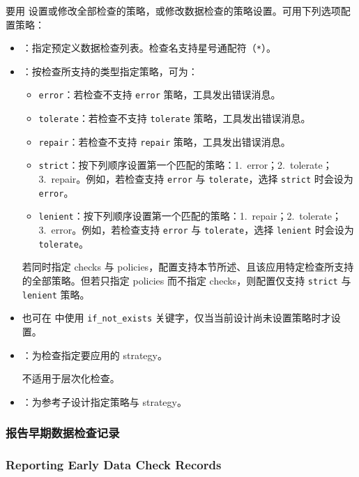 要用  设置或修改全部检查的策略，或修改数据检查的策略设置。可用下列选项配置策略：
\begin{itemize}
  \item {}：指定预定义数据检查列表。检查名支持星号通配符（\texttt{*}）。
  \item {}：按检查所支持的类型指定策略，可为：
  \begin{itemize}
    \item \texttt{error}：若检查不支持 \texttt{error} 策略，工具发出错误消息。
    \item \texttt{tolerate}：若检查不支持 \texttt{tolerate} 策略，工具发出错误消息。
    \item \texttt{repair}：若检查不支持 \texttt{repair} 策略，工具发出错误消息。
    \item \texttt{strict}：按下列顺序设置第一个匹配的策略：1.~error；2.~tolerate；3.~repair。例如，若检查支持 \texttt{error} 与 \texttt{tolerate}，选择 \texttt{strict} 时会设为 \texttt{error}。
    \item \texttt{lenient}：按下列顺序设置第一个匹配的策略：1.~repair；2.~tolerate；3.~error。例如，若检查支持 \texttt{error} 与 \texttt{tolerate}，选择 \texttt{lenient} 时会设为 \texttt{tolerate}。
  \end{itemize}
\begin{noteBox}
若同时指定 checks 与 policies，配置支持本节所述、且该应用特定检查所支持的全部策略。但若只指定 policies 而不指定 checks，则配置仅支持 \texttt{strict} 与 \texttt{lenient} 策略。
\end{noteBox}
  \item 也可在  中使用 \texttt{if\_not\_exists} 关键字，仅当当前设计尚未设置策略时才设置。
  \item {}：为检查指定要应用的 strategy。
\begin{noteBox}
 不适用于层次化检查。
\end{noteBox}
  \item {}：为参考子设计指定策略与 strategy。
\end{itemize}

\subsubsection{报告早期数据检查记录}
\subsubsection*{Reporting Early Data Check Records}

